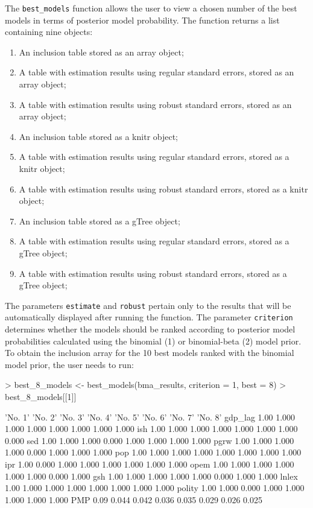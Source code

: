 \documentclass[a4paper]{article}
\begin{document}
The \verb+best_models+ function allows the user to view a chosen number of the best models in terms of posterior model probability.
The function returns a list containing nine objects:
\begin{enumerate}
    \item An inclusion table stored as an array object;
    \item A table with estimation results using regular standard errors, stored as an array object;
    \item A table with estimation results using robust standard errors, stored as an array object;
    \item An inclusion table stored as a knitr object;
    \item A table with estimation results using regular standard errors, stored as a knitr object;
    \item A table with estimation results using robust standard errors, stored as a knitr object;
    \item An inclusion table stored as a gTree object;
    \item A table with estimation results using regular standard errors, stored as a gTree object;
    \item A table with estimation results using robust standard errors, stored as a gTree object;
\end{enumerate}
The parameters \verb+estimate+ and \verb+robust+ pertain only to the results that will be automatically displayed after running the function.
The parameter \verb+criterion+ determines whether the models should be ranked according to posterior model probabilities calculated using the binomial (1) or binomial-beta (2) model prior.
To obtain the inclusion array for the 10 best models ranked with the binomial model prior, the user needs to run:

\begin{Schunk}
\begin{Sinput}
> best_8_models <- best_models(bma_results, criterion = 1, best = 8)
> best_8_models[[1]]
\end{Sinput}
\begin{Soutput}
        'No. 1' 'No. 2' 'No. 3' 'No. 4' 'No. 5' 'No. 6' 'No. 7' 'No. 8'
gdp_lag    1.00   1.000   1.000   1.000   1.000   1.000   1.000   1.000
ish        1.00   1.000   1.000   1.000   1.000   1.000   1.000   0.000
sed        1.00   1.000   1.000   0.000   1.000   1.000   1.000   1.000
pgrw       1.00   1.000   1.000   1.000   0.000   1.000   1.000   1.000
pop        1.00   1.000   1.000   1.000   1.000   1.000   1.000   1.000
ipr        1.00   0.000   1.000   1.000   1.000   1.000   1.000   1.000
opem       1.00   1.000   1.000   1.000   1.000   1.000   0.000   1.000
gsh        1.00   1.000   1.000   1.000   1.000   0.000   1.000   1.000
lnlex      1.00   1.000   1.000   1.000   1.000   1.000   1.000   1.000
polity     1.00   1.000   0.000   1.000   1.000   1.000   1.000   1.000
PMP        0.09   0.044   0.042   0.036   0.035   0.029   0.026   0.025
\end{Soutput}
\end{Schunk}
\end{document}
